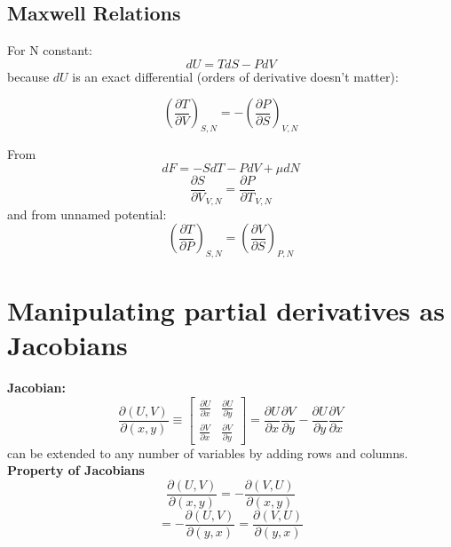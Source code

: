 \documentclass[11pt]{article}
\theoremstyle{definition}
\begin{document}
\subsection{Maxwell Relations}
For N constant:
\[ dU = TdS - PdV \] 
because $ dU $ is an exact differential (orders of derivative doesn't matter):
\begin{shaded*}
	\[ \left (\frac{\partial T}{\partial V} \right ) _{S,N} = - \left( \frac{\partial P}{\partial S} \right)_{V,N} \] 
\end{shaded*}

From \[ dF = -SdT - PdV + \mu dN \] 
\[ \frac{\partial S}{\partial V}_{V,N} = \frac{\partial P}{\partial T}_{V,N} \] 
and from unnamed potential:
\[ \left( \frac{\partial T}{\partial P} \right)_{S,N} = \left( \frac{\partial V}{\partial S} \right )_{P,N} \] 

\section{Manipulating partial derivatives as Jacobians}
\textbf{Jacobian:} 
\begin{equation}
	\frac{\partial (U,V)}{\partial (x,y)} \equiv \begin{bmatrix}
	\frac{\partial U}{\partial x} & \frac{\partial U}{\partial y}  \\
	\frac{\partial V}{\partial x}& \frac{\partial V}{\partial y} 
	\end{bmatrix} 	
	= \frac{\partial U}{\partial x} \frac{\partial V}{\partial y} - \frac{\partial U}{\partial y} \frac{\partial V}{\partial x}
\end{equation}
can be extended to any number of variables by adding rows and columns. \\
\textbf{Property of Jacobians} 
\[ \frac{\partial (U,V)}{\partial (x,y)} = - \frac{\partial (V,U)}{\partial (x,y)}\] 
\[ = - \frac{\partial (U,V)}{\partial (y,x)} = \frac{\partial (V,U)}{\partial (y,x)} \] 
\end{document}
